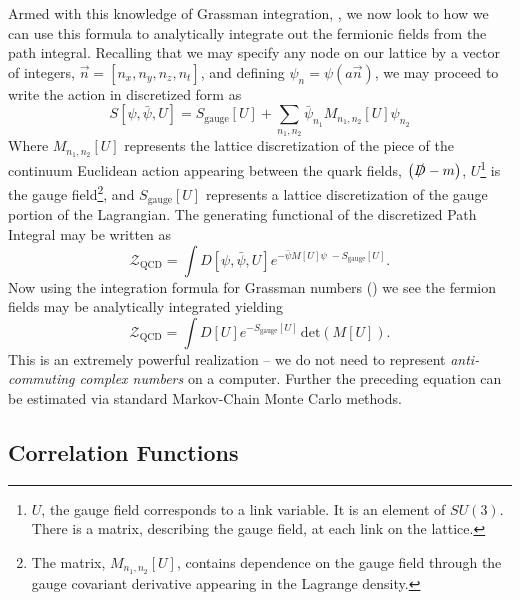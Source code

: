 Armed with this knowledge of Grassman integration, , we now look to how we can use this formula to analytically integrate out the fermionic fields from the path integral. Recalling that we may specify any node on our lattice by a vector of integers, $\vec{n} = [n_x , n_y , n_z , n_t]$, and defining $\psi_n = \psi(a\vec{n})$, we may proceed to write the action in discretized form as 
\begin{equation*}
S[\psi,\bar{\psi},U] = S_{\mathrm{gauge}}[U]  + \sum_{n_1,n_2} \bar{\psi}_{n_1} M_{n_1,n_2}[U] \psi_{n_2} 
\end{equation*}
Where $M_{n_1,n_2}[U]$ represents the lattice discretization of the piece of the continuum Euclidean action appearing between the quark fields, $\left( \slashed{D} - m \right)$, $U$\footnote{$U$, the gauge field corresponds to a link variable. It is an element of $SU(3)$. There is a matrix, describing the gauge field, at each link on the lattice.} is the gauge field\footnote{The matrix, $M_{n_1,n_2}[U]$, contains dependence on the gauge field through the gauge covariant derivative appearing in the Lagrange density.}, and $S_\mathrm{gauge}[U]$ represents a lattice discretization of the gauge portion of the Lagrangian. The generating functional of the discretized Path Integral may be written as 
\begin{equation*}
\mathcal{Z}_{\mathrm{QCD}} = \int D[\psi,\bar{\psi},U] e^{-\bar{\psi}M[U]\psi \; - S_{\mathrm{gauge}}[U]}.
\end{equation*} 
Now using the integration formula for Grassman numbers () we see the fermion fields may be analytically integrated yielding 
\begin{equation*}
\mathcal{Z}_{\mathrm{QCD}} = \int D[U] e^{- S_{\mathrm{gauge}}[U]} \,\mathrm{det}(M[U]).
\end{equation*} 
This is an extremely powerful realization -- we do not need to represent \emph{anti-commuting complex numbers} on a computer. Further the preceding equation can be estimated via standard Markov-Chain Monte Carlo methods. 

 
\subsection{Correlation Functions}

